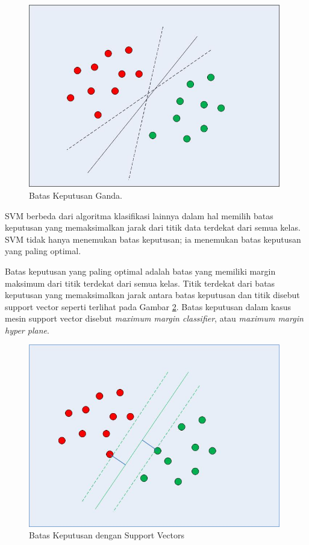 \begin{figure}[H]
	\centering
	\includegraphics[width=11cm, height=8cm]{gambar/implementing-svm-kernel-svm-python-scikit-learn}
	\caption{Batas Keputusan Ganda.}
	\label{svm1}
\end{figure}

\par SVM berbeda dari algoritma klasifikasi lainnya dalam hal memilih batas keputusan yang memaksimalkan jarak dari titik data terdekat dari semua kelas. SVM tidak hanya menemukan batas keputusan; ia menemukan batas keputusan yang paling optimal.

\par Batas keputusan yang paling optimal adalah batas yang memiliki margin maksimum dari titik terdekat dari semua kelas. Titik terdekat dari batas keputusan yang memaksimalkan jarak antara batas keputusan dan titik disebut support vector seperti terlihat pada Gambar \ref{svm2}. Batas keputusan dalam kasus mesin support vector disebut \textit{maximum margin classifier}, atau \textit{maximum margin hyper plane}.

\begin{figure}[H]
	\centering
	\includegraphics[width=11cm, height=8cm]{gambar/implementing-svm-kernel-svm-python-scikit-learn-2}
	\caption{Batas Keputusan dengan Support Vectors}
	\label{svm2}
\end{figure}

